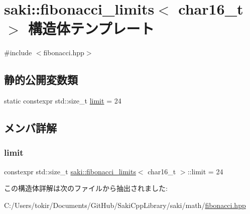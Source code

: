 \hypertarget{structsaki_1_1fibonacci__limits_3_01char16__t_01_4}{}\section{saki\+:\+:fibonacci\+\_\+limits$<$ char16\+\_\+t $>$ 構造体テンプレート}
\label{structsaki_1_1fibonacci__limits_3_01char16__t_01_4}


{\ttfamily \#include $<$fibonacci.\+hpp$>$}

\subsection*{静的公開変数類}
\begin{DoxyCompactItemize}
\item 
static constexpr std\+::size\+\_\+t \mbox{\hyperlink{structsaki_1_1fibonacci__limits_3_01char16__t_01_4_af2d066a8a7635c9f8ed86b5aa0583f4e}{limit}} = 24
\end{DoxyCompactItemize}


\subsection{メンバ詳解}
\mbox{\label{structsaki_1_1fibonacci__limits_3_01char16__t_01_4_af2d066a8a7635c9f8ed86b5aa0583f4e}} 
\subsubsection{\texorpdfstring{limit}{limit}}
{\footnotesize\ttfamily constexpr std\+::size\+\_\+t \mbox{\hyperlink{structsaki_1_1fibonacci__limits}{saki\+::fibonacci\+\_\+limits}}$<$ char16\+\_\+t $>$\+::limit = 24\hspace{0.3cm}{\ttfamily [static]}}



この構造体詳解は次のファイルから抽出されました\+:\begin{DoxyCompactItemize}
\item 
C\+:/\+Users/tokir/\+Documents/\+Git\+Hub/\+Saki\+Cpp\+Library/saki/math/\mbox{\hyperlink{fibonacci_8hpp}{fibonacci.\+hpp}}\end{DoxyCompactItemize}
